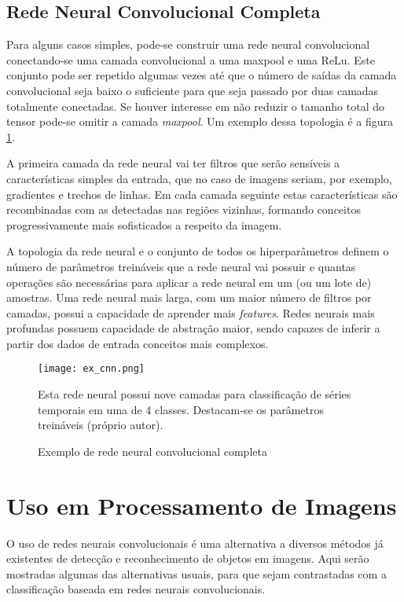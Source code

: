 \subsection{Rede Neural Convolucional Completa}
Para alguns casos simples, pode-se construir uma rede neural convolucional
conectando-se uma camada convolucional a uma maxpool e uma ReLu. Este conjunto
pode ser repetido algumas vezes até que o número de saídas da camada
convolucional seja baixo o suficiente para que seja passado por duas camadas
totalmente conectadas. Se houver interesse em não reduzir o tamanho total do
tensor pode-se omitir a camada \emph{maxpool}. Um exemplo dessa topologia é a
figura \ref{fig:ex_cnn}.

A primeira camada da rede neural vai ter filtros que serão sensíveis a
características simples da entrada, que no caso de imagens seriam, por exemplo,
gradientes e trechos de linhas. Em
cada camada seguinte estas características são recombinadas com as detectadas
nas regiões vizinhas, formando conceitos progressivamente mais sofisticados a
respeito da imagem.

A topologia da rede neural e o conjunto de todos os hiperparâmetros definem o
número de parâmetros treináveis que a rede neural vai possuir e quantas
operações são necessárias para aplicar a rede neural em um (ou um lote de)
amostras. Uma rede neural mais larga, com um maior número de filtros por
camadas, possui a capacidade de aprender mais \emph{features}. Redes neurais
mais profundas possuem capacidade de abstração maior, sendo capazes de inferir
a partir dos dados de entrada conceitos mais complexos.

\begin{figure}[!htb]
	\centering
	\texttt{[image: ex\_cnn.png]}
	\caption{Exemplo de rede neural convolucional completa}
	\label{fig:ex_cnn}
	Esta rede neural possui nove camadas para
	classificação de séries temporais em uma de 4 classes. Destacam-se os
	parâmetros treináveis (próprio autor).
\end{figure}

\section{Uso em Processamento de Imagens}
O uso de redes neurais convolucionais é uma alternativa a diversos métodos já
existentes de detecção e reconhecimento de objetos em imagens. Aqui serão
mostradas algumas das alternativas usuais, para que sejam contrastadas
com a classificação baseada em redes neurais convolucionais.

